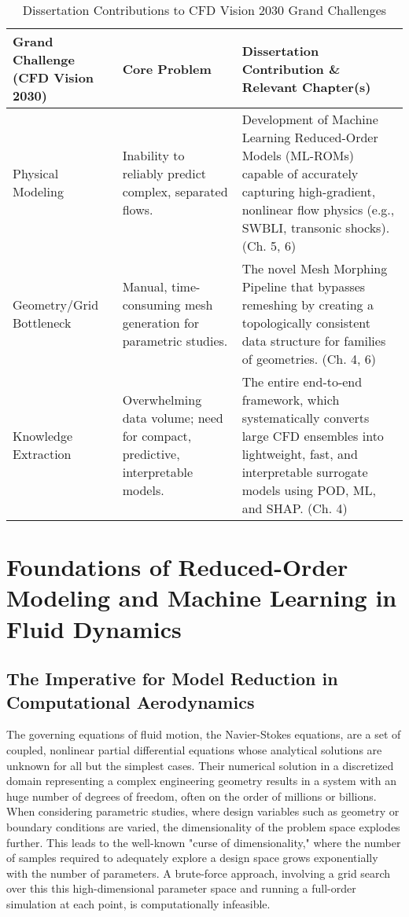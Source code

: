 \documentclass[dsc, EN]{ufabcFHZh}
\begin{document}
{\begin{table}[htbp]
    \centering
    \caption{Dissertation Contributions to CFD Vision 2030 Grand Challenges}
    \label{tab:cfd_vision_contributions}
    \begin{tabular}{|p{3cm}|p{4cm}|p{7cm}|}
        \hline
        \textbf{Grand Challenge (CFD Vision 2030)} & \textbf{Core Problem} & \textbf{Dissertation Contribution \& Relevant Chapter(s)} \\
        \hline
        Physical Modeling & Inability to reliably predict complex, separated flows. & Development of Machine Learning Reduced-Order Models (ML-ROMs) capable of accurately capturing high-gradient, nonlinear flow physics (e.g., SWBLI, transonic shocks). (Ch. 5, 6) \\
        \hline
        Geometry/Grid Bottleneck & Manual, time-consuming mesh generation for parametric studies. & The novel Mesh Morphing Pipeline that bypasses remeshing by creating a topologically consistent data structure for families of geometries. (Ch. 4, 6) \\
        \hline
        Knowledge Extraction & Overwhelming data volume; need for compact, predictive, interpretable models. & The entire end-to-end framework, which systematically converts large CFD ensembles into lightweight, fast, and interpretable surrogate models using POD, ML, and SHAP. (Ch. 4) \\
        \hline
    \end{tabular}
\end{table}

\chapter{Foundations of Reduced-Order Modeling and Machine Learning in Fluid Dynamics}
\label{chap:lit_review}

\section{ The Imperative for Model Reduction in Computational Aerodynamics}


The governing equations of fluid motion, the Navier-Stokes equations, are a set of coupled, nonlinear partial differential equations whose analytical solutions are unknown for all but the simplest cases. Their numerical solution in a discretized domain representing a complex engineering geometry results in a system with an huge number of degrees of freedom, often on the order of millions or billions. When considering parametric studies, where design variables such as geometry or boundary conditions are varied, the dimensionality of the problem space explodes further. This leads to the well-known "curse of dimensionality," where the number of samples required to adequately explore a design space grows exponentially with the number of parameters. A brute-force approach, involving a grid search over this this high-dimensional parameter space and running a full-order simulation at each point, is computationally infeasible.

}
\end{document}
